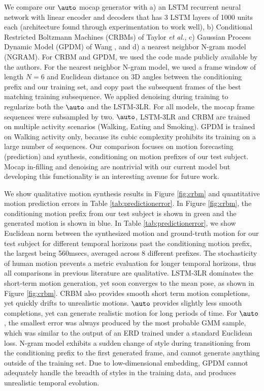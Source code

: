 \documentclass[10pt,twocolumn,letterpaper]{article}
\begin{document}
We compare our $\auto$ mocap generator with  a) an LSTM recurrent neural network with linear encoder and decoders that has 3 LSTM layers of 1000 units each (architecture found through experimentation to work well), b) Conditional Restricted Boltzmann Machines (CRBMs) of Taylor \textit{et al.}\cite{thr-mhmub-06}, c)  Gaussian Process Dynamic Model (GPDM) of Wang \ea\cite{Wang06gaussianprocess}, and d) a nearest neighbor N-gram model (NGRAM).   For CRBM and GPDM, we used the code made publicly available by the authors. For the nearest neighbor N-gram model, we used a frame window of length $N=6$ and Euclidean distance on 3D angles between the conditioning prefix and our training set,  and copy past the subsequent frames of the best matching training subsequence.  
We applied denoising during training to regularize both the $\auto$ and the LSTM-3LR.  For all models, the mocap frame sequences were subsampled by two. $\auto$, LSTM-3LR and CRBM are trained on multiple activity scenarios (Walking, Eating and Smoking).  GPDM is trained on Walking activity only, because   its  cubic complexity prohibits its training on a large number of  sequences.  
Our comparison focuses  on motion forecasting (prediction) and synthesis, conditioning on motion prefixes of our test subject.  Mocap in-filling and denoising  are nontrivial with our current  model but developing this functionality is an interesting avenue for future work. 

 
We show  qualitative motion synthesis results in Figure \ref{fig:crbm}  and  quantitative motion prediction errors in Table \ref{tab:predictionerror}.  In Figure \ref{fig:crbm},  the conditioning motion prefix from our test subject is shown in green  and the generated motion is shown in blue. 
In Table \ref{tab:predictionerror}, we show Euclidean norm between the synthesized motion  and ground-truth   motion for our test subject  for different temporal horizons past the conditioning motion prefix, the largest being 560msecs, averaged across 8 different prefixes. %
The stochasticity of human motion prevents a metric evaluation for longer temporal horizons, thus all comparisons in previous literature are qualitative.  
LSTM-3LR dominates the short-term motion generation, yet soon converges to the mean pose, as shown in Figure \ref{fig:crbm}. CRBM also provides smooth short term motion completions,  yet quickly drifts to unrealistic motions. $\auto$ provides slightly less smooth completions, yet can generate realistic  motion for long periods of time. For $\auto$, the smallest error was always produced by the most probable GMM sample, which was similar to the output of an ERD trained under a standard Euclidean loss. N-gram model exhibits a sudden change of style during transitioning from the conditioning prefix to the first generated frame, and cannot generate anything outside of the training set. Due to low-dimensional embedding, GPDM cannot adequately handle the breadth of styles in the training data, and produces unrealistic temporal evolution.  
\end{document}
